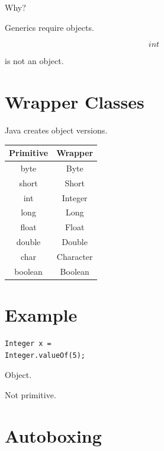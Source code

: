 \documentclass[11pt,a4paper]{book}
\begin{document}
Why?


Generics require objects.


\[
int
\]

is not an object.


\section{Wrapper Classes}

Java creates object versions.


\begin{tabular}{|c|c|}
\hline
Primitive & Wrapper \\
\hline
byte & Byte \\
\hline
short & Short \\
\hline
int & Integer \\
\hline
long & Long \\
\hline
float & Float \\
\hline
double & Double \\
\hline
char & Character \\
\hline
boolean & Boolean \\
\hline
\end{tabular}


\section{Example}

\begin{verbatim}
Integer x =
Integer.valueOf(5);
\end{verbatim}


Object.


Not primitive.


\section{Autoboxing}
\end{document}
